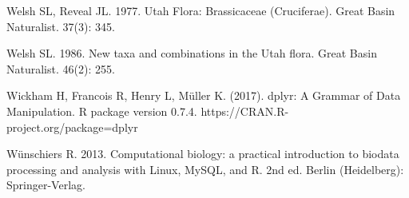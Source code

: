 Welsh SL, Reveal JL. 1977. Utah Flora: Brassicaceae (Cruciferae). Great Basin Naturalist. 37(3): 345.

Welsh SL. 1986. New taxa and combinations in the Utah flora. Great Basin Naturalist. 46(2): 255.

Wickham H, Francois R, Henry L, Müller K. (2017). dplyr: A Grammar of Data Manipulation. R package version 0.7.4. https://CRAN.R-project.org/package=dplyr

Wünschiers R. 2013. Computational biology: a practical introduction to biodata processing and analysis with Linux, MySQL, and R. 2nd ed. Berlin (Heidelberg): Springer-Verlag.

\setlength{\parindent}{0em}
\setlength{\leftskip}{0em}
\setlength{\parskip}{6pt}
\doublespacing
